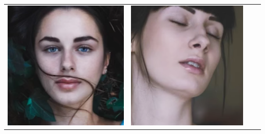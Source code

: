 \begin{longtable}{|N||c|c|c|}
\begin{minipage}{.29\textwidth}
    \includegraphics[width=\textwidth,height=\textheight,keepaspectratio]{images/match_other_1_targ}
  \end{minipage} & 
  \begin{minipage}{.29\textwidth}
    \includegraphics[width=\textwidth,height=\textheight,keepaspectratio]{images/match_other_1_res}

\end{minipage}
\end{longtable}
